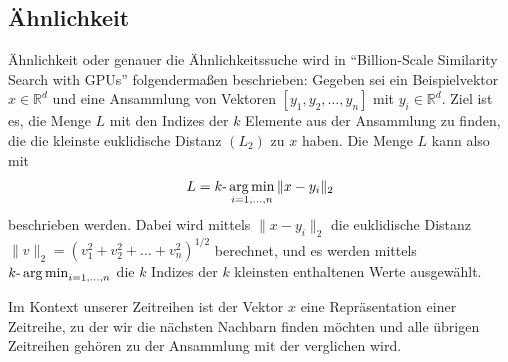 \subsection{Ähnlichkeit}
Ähnlichkeit oder genauer die Ähnlichkeitssuche wird in "`Billion-Scale Similarity Search with GPUs"' \cite[Ch. 2]{faissAehnlichkeitssuche} folgendermaßen beschrieben: Gegeben sei ein Beispielvektor $x \in \mathbb{R}^d$ und eine Ansammlung von Vektoren $[y_1,y_2,\ldots,y_n]$ mit $y_i \in \mathbb{R}^d$. Ziel ist es, die Menge $L$ mit den Indizes der $k$ Elemente aus der Ansammlung zu finden, die die kleinste euklidische Distanz $(L_2)$ zu $x$ haben. Die Menge $L$ kann also mit
\[L= k \text{-}\operatorname*{arg\,min}_{i=1,\ldots,n}\|x-y_i\|_2\]
beschrieben werden. Dabei wird mittels $\|x-y_i\|_2$ die euklidische Distanz \\ $\|v\|_2 = (v_1^2+v_2^2+ \ldots +v_n^2)^{1/2}$ berechnet, und es werden mittels $k\text{-}\operatorname*{arg\,min}_{i=1,\ldots,n}$ die $k$ Indizes der $k$ kleinsten enthaltenen Werte ausgewählt.

Im Kontext unserer Zeitreihen ist der Vektor $x$ eine Repräsentation einer Zeitreihe, zu der wir die nächsten Nachbarn finden möchten und alle übrigen Zeitreihen gehören zu der Ansammlung mit der verglichen wird.